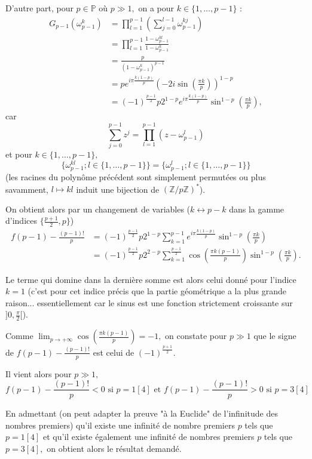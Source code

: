 \begin{enumerate}
D'autre part, pour $p\in \mathbb{P}$ où $p\gg1,$ on a pour $k\in \{1,\ldots,p-1\}$ : 
\begin{align*}
G_{p-1}(\omega_{p-1}^{k}) & = \prod_{l=1}^{p-1}\left(\sum_{j=0}^{l-1}\omega_{p-1}^{kj}\right)\\
& = \prod_{l=1}^{p-1}\frac{1-\omega_{p-1}^{kl}}{1-\omega_{p-1}^{k}}\\
& = \frac{p}{(1-\omega_{p-1}^{k})^{p-1}}\\
& = pe^{i\pi\frac{k(1-p)}{p}}\left( -2i\sin(\frac{\pi k}{p})\right)^{1-p}\\
& = (-1)^{\frac{p-1}{2}}p2^{1-p}e^{i\pi\frac{k(1-p)}{p}}\sin^{1-p}\left(\frac{\pi k}{p}\right),
\end{align*}
car $$\sum_{j=0}^{p-1}z^{j}=\prod_{l=1}^{p-1}(z-\omega_{p-1}^{l})$$ et pour $k\in\{1,\ldots,p-1\},$ $$\{\omega_{p-1}^{kl};l\in\{1,\ldots,p-1\}\}=\{\omega_{p-1}^{l};l\in\{1,\ldots,p-1\}\}$$ (les racines du polynôme précédent sont simplement permutées ou plus savamment, $l \mapsto kl$ induit une bijection de $\left(\mathbb{Z}/p\mathbb{Z}\right)^{*}$).

On obtient alors par un changement de variables ($\displaystyle k\leftrightarrow p-k$ dans la gamme d'indices $\displaystyle \{\frac{p+1}{2},p\}$)
\begin{align*}
f(p-1)-\frac{(p-1)!}{p} &  = (-1)^{\frac{p-1}{2}}p2^{1-p}\sum_{k=1}^{p-1}e^{i\pi\frac{k(1-p)}{p}}\sin^{1-p}\left(\frac{\pi k}{p}\right)\\
&  = (-1)^{\frac{p-1}{2}}p2^{2-p}\sum_{k=1}^{\frac{p-1}{2}}\cos\left( \frac{\pi k(p-1)}{p}\right)\sin^{1-p}\left(\frac{\pi k}{p}\right).
\end{align*}

Le terme qui domine dans la dernière somme est alors celui donné pour l'indice $k=1$ (c'est pour cet indice précis que la partie géométrique a la plus grande raison... essentiellement car le sinus est une fonction strictement croissante sur $\displaystyle ]0,\frac{\pi}{2}[$).

Comme $\displaystyle \lim_{p\rightarrow +\infty}\cos\left( \frac{\pi k(p-1)}{p}\right)=-1,$ on constate pour $p\gg1$ que le  signe de $\displaystyle f(p-1)-\frac{(p-1)!}{p}$ est celui de $\displaystyle (-1)^{\frac{p+1}{2}}.$

Il vient alors pour $p\gg 1,$ $$f(p-1)-\frac{(p-1)!}{p}<0 \mbox{ si } p=1[4] \mbox{ et } f(p-1)-\frac{(p-1)!}{p}>0 \mbox{ si } p=3[4]$$

En admettant (on peut adapter la preuve "à la Euclide" de l'infinitude des nombres premiers) qu'il existe une infinité de nombre premiers $p$ tels que $p=1[4]$ et qu'il existe également une infinité de nombres premiers $p$ tels que $p=3[4],$ on obtient alors 
le résultat demandé.
\end{enumerate}



